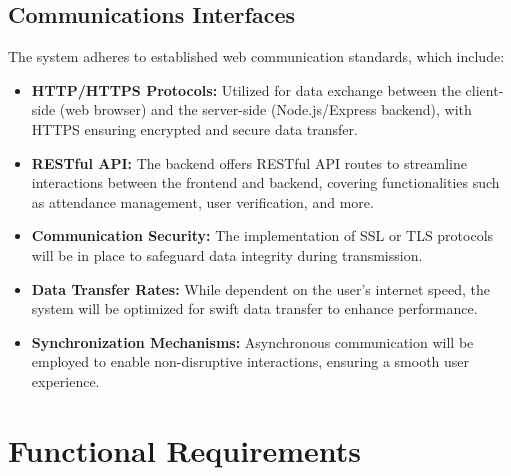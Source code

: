 \documentclass[a4paper, 12pt]{article}
\begin{document}
\subsection{Communications Interfaces}
The system adheres to established web communication standards, which include:
\begin{itemize}
    \item \textbf{HTTP/HTTPS Protocols:} Utilized for data exchange between the client-side (web browser) and the server-side (Node.js/Express backend), with HTTPS ensuring encrypted and secure data transfer.
    \item \textbf{RESTful API:} The backend offers RESTful API routes to streamline interactions between the frontend and backend, covering functionalities such as attendance management, user verification, and more.
    \item \textbf{Communication Security:} The implementation of SSL or TLS protocols will be in place to safeguard data integrity during transmission.
    \item \textbf{Data Transfer Rates:} While dependent on the user’s internet speed, the system will be optimized for swift data transfer to enhance performance.
    \item \textbf{Synchronization Mechanisms:} Asynchronous communication will be employed to enable non-disruptive interactions, ensuring a smooth user experience.
\end{itemize}

\section{Functional Requirements}
\end{document}
